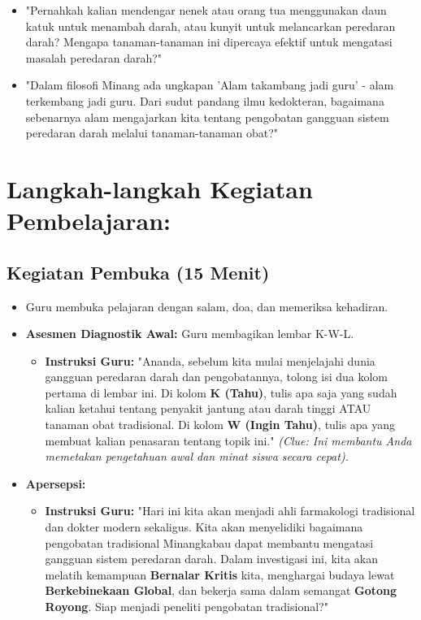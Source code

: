 \documentclass[a4paper,12pt]{article}
\begin{document}
\begin{itemize}
\item "Pernahkah kalian mendengar nenek atau orang tua menggunakan daun katuk untuk menambah darah, atau kunyit untuk melancarkan peredaran darah? Mengapa tanaman-tanaman ini dipercaya efektif untuk mengatasi masalah peredaran darah?"
\item "Dalam filosofi Minang ada ungkapan 'Alam takambang jadi guru' - alam terkembang jadi guru. Dari sudut pandang ilmu kedokteran, bagaimana sebenarnya alam mengajarkan kita tentang pengobatan gangguan sistem peredaran darah melalui tanaman-tanaman obat?"
\end{itemize}

\section{Langkah-langkah Kegiatan Pembelajaran:}

\subsection{Kegiatan Pembuka (15 Menit)}
\begin{itemize}
\item Guru membuka pelajaran dengan salam, doa, dan memeriksa kehadiran.
\item \textbf{Asesmen Diagnostik Awal:} Guru membagikan lembar K-W-L.
    \begin{itemize}
    \item \textbf{Instruksi Guru:} "Ananda, sebelum kita mulai menjelajahi dunia gangguan peredaran darah dan pengobatannya, tolong isi dua kolom pertama di lembar ini. Di kolom \textbf{K (Tahu)}, tulis apa saja yang sudah kalian ketahui tentang penyakit jantung atau darah tinggi ATAU tanaman obat tradisional. Di kolom \textbf{W (Ingin Tahu)}, tulis apa yang membuat kalian penasaran tentang topik ini." \textit{(Clue: Ini membantu Anda memetakan pengetahuan awal dan minat siswa secara cepat).}
    \end{itemize}
\item \textbf{Apersepsi:}
    \begin{itemize}
    \item \textbf{Instruksi Guru:} "Hari ini kita akan menjadi ahli farmakologi tradisional dan dokter modern sekaligus. Kita akan menyelidiki bagaimana pengobatan tradisional Minangkabau dapat membantu mengatasi gangguan sistem peredaran darah. Dalam investigasi ini, kita akan melatih kemampuan \textbf{Bernalar Kritis} kita, menghargai budaya lewat \textbf{Berkebinekaan Global}, dan bekerja sama dalam semangat \textbf{Gotong Royong}. Siap menjadi peneliti pengobatan tradisional?"
    \end{itemize}
\end{itemize}
\end{document}
